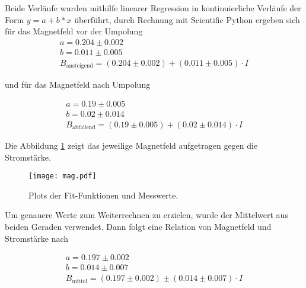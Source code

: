 \noindent Beide Verläufe wurden mithilfe linearer Regression in kontinuierliche Verläufe der Form $y = a + b*x$ überführt, durch Rechnung mit Scientific Python ergeben sich für das 
Magnetfeld vor der Umpolung
\begin{align*}
a = 0.204 \pm 0.002\\
b = 0.011 \pm 0.005\\
B_{\text{ansteigend}} = (0.204 \pm 0.002) + (0.011 \pm 0.005) \cdot I
\end{align*}

und für das Magnetfeld nach Umpolung

\begin{align*}
a = 0.19 \pm 0.005\\
b = 0.02 \pm 0.014\\
B_{\text{abfallend}} = (0.19 \pm 0.005) + (0.02 \pm 0.014) \cdot I
\end{align*}

\noindent Die Abbildung \ref{fig:plots} zeigt das jeweilige Magnetfeld aufgetragen gegen die Stromstärke. 

\begin{figure}
 \centering
 \texttt{[image: mag.pdf]}
 \caption{Plots der Fit-Funktionen und Messwerte.}
 \label{fig:plots}
\end{figure} 
\FloatBarrier
\noindent Um genauere Werte zum Weiterrechnen zu erzielen, wurde der Mittelwert aus
beiden Geraden verwendet. Dann folgt eine Relation von Magnetfeld und Stromstärke nach

\begin{align*}
a = 0.197 \pm 0.002\\
b = 0.014 \pm 0.007\\
B_{\text{mittel}} = (0.197 \pm 0.002) \pm (0.014 \pm 0.007) \cdot I
\end{align*}

